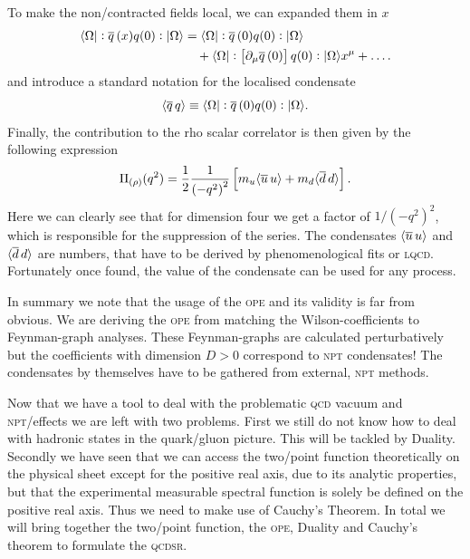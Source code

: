 \documentclass[../../index.tex]{subfiles}
\begin{document}
To make the non\-/contracted fields local, we can expanded them in $x$
\begin{equation}
  \begin{split}
    \langle \Omega \vert: \overline{q}\,(x) q(0):\vert \Omega \rangle &= \langle\Omega\vert: \overline{q}\,(0) q(0): \vert\Omega\rangle\\
    &\quad+ \langle\Omega\vert:\left[ \partial_\mu \overline{q}\,(0) \right]
    q(0):\vert\Omega\rangle x^\mu + \dots.
  \end{split}
\end{equation}
and introduce a standard notation for the localised condensate
\begin{equation}
  \langle \overline{q}\,q \rangle \equiv \langle\Omega\vert: \overline{q}\,(0) q(0):\vert\Omega\rangle.
\end{equation}
Finally, the contribution to the rho scalar correlator is then given by the
following expression
\begin{equation}
  \Pi_{(\rho)}(q^2) = \frac{1}{2} \frac{1}{\left(-q^2\right)^2} \left[ m_u\langle \overline{u}\, u \rangle + m_d \langle \overline{d}\, d \rangle\right].
\end{equation}
Here we can clearly see that for dimension four we get a factor of
\(1/(-q^2)^2\), which is responsible for the suppression of the series. The
condensates \(\langle\overline{u}\,u\rangle\) and \(\langle\overline{d}\,d\rangle\) are
numbers, that have to be derived by phenomenological fits or \textsc{lqcd}.
Fortunately once found, the value of the condensate can be used for any process.

In summary we note that the usage of the \textsc{ope} and its validity is far
from obvious. We are deriving the \textsc{ope} from matching the
Wilson-coefficients to Feynman-graph analyses. These Feynman-graphs are
calculated perturbatively but the coefficients with dimension $D>0$ correspond
to \textsc{npt} condensates! The condensates by themselves have to be gathered
from external, \textsc{npt} methods.

Now that we have a tool to deal with the problematic \textsc{qcd} vacuum and
\textsc{npt}\-/effects we are left with two problems. First we still do not know
how to deal with hadronic states in the quark\-/gluon picture. This will be
tackled by Duality. Secondly we have seen that we can access the two\-/point
function theoretically on the physical sheet except for the positive real axis,
due to its analytic properties, but that the experimental measurable spectral
function is solely be defined on the positive real axis. Thus we need to make
use of Cauchy's Theorem. In total we will bring together the two\-/point
function, the \textsc{ope}, Duality and Cauchy's theorem to formulate the
\textsc{qcdsr}.
\end{document}
